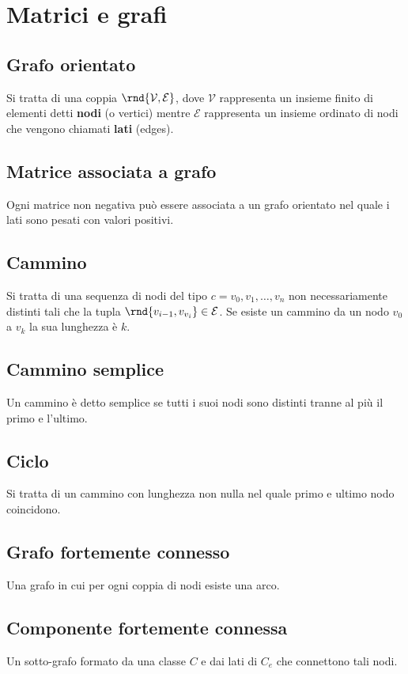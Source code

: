 \documentclass[\main/main.tex]{subfiles}
\begin{document}
\section{Matrici e grafi}
\subsection{Grafo orientato}
Si tratta di una coppia \(\rnd{\mathcal{V}, \mathcal{E}}\), dove \(\mathcal{V}\) rappresenta un insieme finito di elementi detti \textbf{nodi} (o vertici) mentre \(\mathcal{E}\) rappresenta un insieme ordinato di nodi che vengono chiamati \textbf{lati} (edges).

\subsection{Matrice associata a grafo}
Ogni matrice non negativa può essere associata a un grafo orientato nel quale i lati sono pesati con valori positivi.

\subsection{Cammino}
Si tratta di una sequenza di nodi del tipo \(c = {v_0, v_1, \ldots, v_n}\) non necessariamente distinti tali che la tupla \(\rnd{v_{i-1}, v_{v_i}} \in \mathcal{E}\). Se esiste un cammino da un nodo \(v_0\) a \(v_k\) la sua lunghezza è \(k\).

\subsection{Cammino semplice}
Un cammino è detto semplice se tutti i suoi nodi sono distinti tranne al più il primo e l'ultimo.

\subsection{Ciclo}
Si tratta di un cammino con lunghezza non nulla nel quale primo e ultimo nodo coincidono.

\subsection{Grafo fortemente connesso}
Una grafo in cui per ogni coppia di nodi esiste una arco.

\subsection{Componente fortemente connessa}
Un sotto-grafo formato da una classe \(C\) e dai lati di \(C_e\) che connettono tali nodi.
\end{document}
